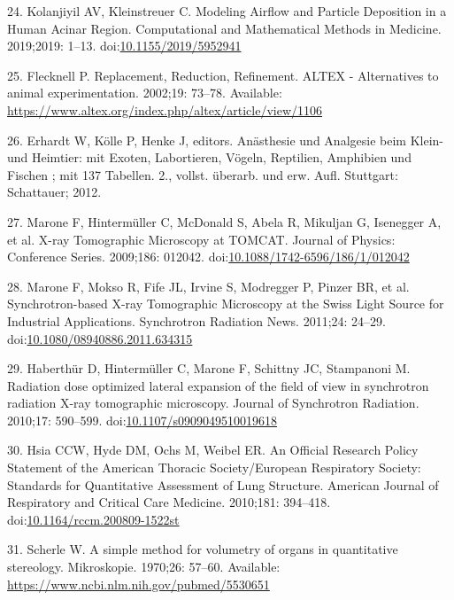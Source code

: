 \documentclass[
  american,
]{article}
\newenvironment{cslreferences}%
  {}%
  {\par}
\begin{document}
\begin{cslreferences}
\leavevmode\hypertarget{ref-6zXNR8r2}{}%
24. Kolanjiyil AV, Kleinstreuer C. Modeling Airflow and Particle Deposition in a Human Acinar Region. Computational and Mathematical Methods in Medicine. 2019;2019: 1--13. doi:\href{https://doi.org/10.1155/2019/5952941}{10.1155/2019/5952941}

\leavevmode\hypertarget{ref-199ALtdJt}{}%
25. Flecknell P. Replacement, Reduction, Refinement. ALTEX - Alternatives to animal experimentation. 2002;19: 73--78. Available: \url{https://www.altex.org/index.php/altex/article/view/1106}

\leavevmode\hypertarget{ref-IdRLVLjl}{}%
26. Erhardt W, Kölle P, Henke J, editors. Anästhesie und Analgesie beim Klein- und Heimtier: mit Exoten, Labortieren, Vögeln, Reptilien, Amphibien und Fischen ; mit 137 Tabellen. 2., vollst. überarb. und erw. Aufl. Stuttgart: Schattauer; 2012.

\leavevmode\hypertarget{ref-knMAkPPz}{}%
27. Marone F, Hintermüller C, McDonald S, Abela R, Mikuljan G, Isenegger A, et al. X-ray Tomographic Microscopy at TOMCAT. Journal of Physics: Conference Series. 2009;186: 012042. doi:\href{https://doi.org/10.1088/1742-6596/186/1/012042}{10.1088/1742-6596/186/1/012042}

\leavevmode\hypertarget{ref-Cp0VRmEj}{}%
28. Marone F, Mokso R, Fife JL, Irvine S, Modregger P, Pinzer BR, et al. Synchrotron-based X-ray Tomographic Microscopy at the Swiss Light Source for Industrial Applications. Synchrotron Radiation News. 2011;24: 24--29. doi:\href{https://doi.org/10.1080/08940886.2011.634315}{10.1080/08940886.2011.634315}

\leavevmode\hypertarget{ref-VELl7OiR}{}%
29. Haberthür D, Hintermüller C, Marone F, Schittny JC, Stampanoni M. Radiation dose optimized lateral expansion of the field of view in synchrotron radiation X-ray tomographic microscopy. Journal of Synchrotron Radiation. 2010;17: 590--599. doi:\href{https://doi.org/10.1107/s0909049510019618}{10.1107/s0909049510019618}

\leavevmode\hypertarget{ref-dNc8FfNn}{}%
30. Hsia CCW, Hyde DM, Ochs M, Weibel ER. An Official Research Policy Statement of the American Thoracic Society/European Respiratory Society: Standards for Quantitative Assessment of Lung Structure. American Journal of Respiratory and Critical Care Medicine. 2010;181: 394--418. doi:\href{https://doi.org/10.1164/rccm.200809-1522st}{10.1164/rccm.200809-1522st}

\leavevmode\hypertarget{ref-KGbSQovR}{}%
31. Scherle W. A simple method for volumetry of organs in quantitative stereology. Mikroskopie. 1970;26: 57--60. Available: \url{https://www.ncbi.nlm.nih.gov/pubmed/5530651}


\end{cslreferences}
\end{document}
